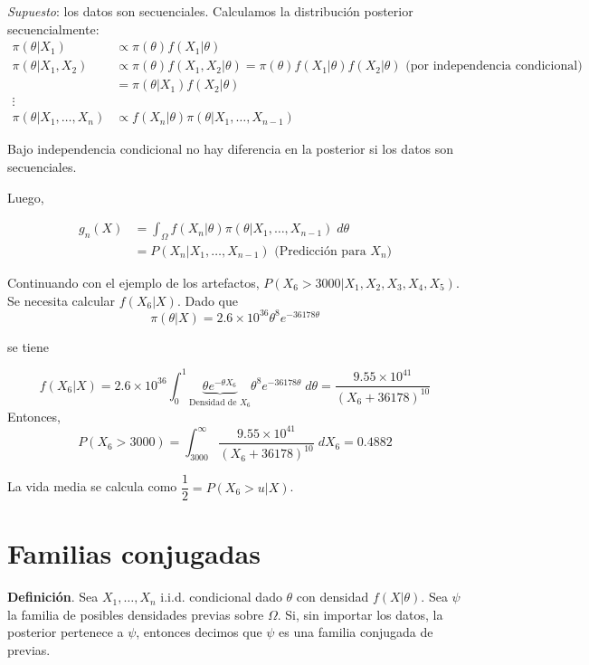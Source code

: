 \documentclass[
  12pt,
]{book}
\begin{document}
\emph{Supuesto}: los datos son secuenciales. Calculamos la distribución posterior secuencialmente:
\begin{align*}
\pi(\theta|X_1) & \propto \pi(\theta) f(X_1|\theta)\\
\pi(\theta|X_1,X_2) &\propto \pi(\theta) f(X_1,X_2|\theta) = \pi(\theta) f(X_1|\theta) f(X_2|\theta) \text{ (por independencia condicional)}
\\ & = \pi(\theta|X_1)f(X_2|\theta)\\
\vdots &  \\
\pi(\theta|X_1,\dots,X_n) & \propto f(X_n|\theta)\pi(\theta|X_1,\dots, X_{n-1})
\end{align*}

Bajo independencia condicional no hay diferencia en la posterior si los datos son secuenciales.

Luego,

\begin{align*} 
g_n(X) & = \int_{\Omega} f(X_n|\theta) \pi(\theta|X_1,\dots, X_{n-1})\;d\theta\\
& = P(X_n|X_1,\dots,X_{n-1}) \text{ (Predicción para }X_n)
\end{align*}

Continuando con el ejemplo de los artefactos, \(P(X_6>3000|X_1,X_2,X_3,X_4,X_5)\). Se necesita calcular \(f(X_6|X)\). Dado que
\[ \pi(\theta|X) = 2.6\times 10^{36}\theta^8 e^{-36178\theta}\]

se tiene

\[ f(X_6|X) = 2.6\times 10^{36} \int_{0}^1 \underbrace{\theta e^{-\theta X_6}}_{\text{Densidad de } X_6}\theta^8 e^{-36178\theta}\;d\theta = \dfrac{9.55 \times 10^{41}}{(X_6+36178)^{10}}\]
Entonces,
\[ P(X_6>3000) = \int_{3000}^{\infty} \dfrac{9.55\times10^{41}}{(X_6+36178)^{10}}\; dX_6 = 0.4882\]

La vida media se calcula como \(\dfrac{1}{2} = P(X_6>u|X)\).

\hypertarget{familias-conjugadas}{%
\section{Familias conjugadas}\label{familias-conjugadas}}

\textbf{Definición}. Sea \(X_1,\dots, X_n\) i.i.d. condicional dado \(\theta\) con densidad \(f(X|\theta)\). Sea \(\psi\) la familia de posibles densidades previas sobre \(\Omega\). Si, sin importar los datos, la posterior pertenece a \(\psi\), entonces decimos que \(\psi\) es una familia conjugada de previas.
\end{document}
